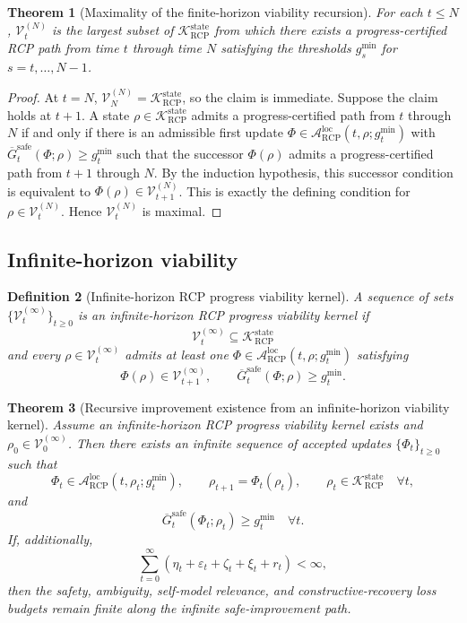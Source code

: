 \documentclass[11pt]{article}
\newtheorem{theorem}{Theorem}[section]
\newtheorem{definition}[theorem]{Definition}
\newcommand{\K}{\mathcal{K}}
\newcommand{\Acal}{\mathcal{A}}
\newcommand{\1}{\mathbf{1}}
\newcommand{\eps}{\varepsilon}
\newcommand{\RCP}{\mathrm{RCP}}
\newcommand{\state}{\mathrm{state}}
\newcommand{\safe}{\mathrm{safe}}
\providecommand{\Vcal}{\mathcal{V}}
\begin{document}
\begin{theorem}[Maximality of the finite-horizon viability recursion]
\label{thm:finite_horizon_viability_maximality}
For each \(t\le N\), \(\Vcal_t^{(N)}\) is the largest subset of \(\K_{\RCP}^{\state}\) from which there exists a progress-certified RCP path from time \(t\) through time \(N\) satisfying the thresholds \(g_s^{\min}\) for \(s=t,\dots,N-1\).
\end{theorem}

\begin{proof}
At \(t=N\), \(\Vcal_N^{(N)}=\K_{\RCP}^{\state}\), so the claim is immediate.  Suppose the claim holds at \(t+1\).  A state \(\rho\in\K_{\RCP}^{\state}\) admits a progress-certified path from \(t\) through \(N\) if and only if there is an admissible first update \(\Phi\in\Acal_{\RCP}^{\mathrm{loc}}(t,\rho;g_t^{\min})\) with \(\overline G_t^{\safe}(\Phi;\rho)\ge g_t^{\min}\) such that the successor \(\Phi(\rho)\) admits a progress-certified path from \(t+1\) through \(N\).  By the induction hypothesis, this successor condition is equivalent to \(\Phi(\rho)\in\Vcal_{t+1}^{(N)}\).  This is exactly the defining condition for \(\rho\in\Vcal_t^{(N)}\).  Hence \(\Vcal_t^{(N)}\) is maximal.
\end{proof}

\subsection{Infinite-horizon viability}

\begin{definition}[Infinite-horizon RCP progress viability kernel]
A sequence of sets \(\{\Vcal_t^{(\infty)}\}_{t\ge0}\) is an infinite-horizon RCP progress viability kernel if
\[
\Vcal_t^{(\infty)}\subseteq\K_{\RCP}^{\state}
\]
and every \(\rho\in\Vcal_t^{(\infty)}\) admits at least one \(\Phi\in\Acal_{\RCP}^{\mathrm{loc}}(t,\rho;g_t^{\min})\) satisfying
\[
\Phi(\rho)\in\Vcal_{t+1}^{(\infty)},
\qquad
\overline G_t^{\safe}(\Phi;\rho)
\ge g_t^{\min}.
\]
\end{definition}

\begin{theorem}[Recursive improvement existence from an infinite-horizon viability kernel]
\label{thm:recursive_improvement_existence}
Assume an infinite-horizon RCP progress viability kernel exists and \(\rho_0\in\Vcal_0^{(\infty)}\).  Then there exists an infinite sequence of accepted updates \(\{\Phi_t\}_{t\ge0}\) such that
\[
\Phi_t\in\Acal_{\RCP}^{\mathrm{loc}}(t,\rho_t;g_t^{\min}),
\qquad
\rho_{t+1}=\Phi_t(\rho_t),
\qquad
\rho_t\in\K_{\RCP}^{\state}
\quad\forall t,
\]
and
\[
\overline G_t^{\safe}(\Phi_t;\rho_t)
\ge g_t^{\min}
\quad\forall t.
\]
If, additionally,
\[
\sum_{t=0}^{\infty}(\eta_t+\eps_t+\zeta_t+\xi_t+r_t)<\infty,
\]
then the safety, ambiguity, self-model relevance, and constructive-recovery loss budgets remain finite along the infinite safe-improvement path.
\end{theorem}
\end{document}
